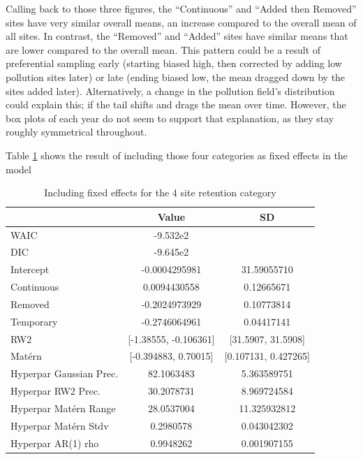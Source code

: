 Calling back to those three figures, the ``Continuous'' and ``Added then Removed'' sites have very similar overall means, an increase compared to the overall mean of all sites.  In contrast, the ``Removed'' and ``Added'' sites have similar means that are lower compared to the overall mean.
This pattern could be a result of preferential sampling early (starting biased high, then corrected by adding low pollution sites later) or late (ending biased low, the mean dragged down by the sites added later). Alternatively, a change in the pollution field's distribution could explain this; if the tail shifts and drags the mean over time.  However, the box plots of each year do not seem to support that explanation,
as they stay roughly symmetrical throughout.

Table \ref{tab:model_INLA_4site_Retention} shows the result of including those four categories as fixed effects in the model

\begin{table}[ht]
	\centering
	\begin{tabular}{l|c|c}
		& Value & SD  \\
		\hline
		WAIC & -9.532e2 & \\
		DIC & -9.645e2 & \\
		Intercept & -0.0004295981  & 31.59055710 \\
		Continuous & 0.0094430558  & 0.12665671   \\
		Removed & -0.2024973929   & 0.10773814   \\
		Temporary & -0.2746064961   & 0.04417141\\
		RW2 & [-1.38555, -0.106361] & [31.5907, 31.5908] \\
		Mat\'{e}rn & [-0.394883, 0.70015] & [0.107131, 0.427265] \\
		Hyperpar Gaussian Prec. & 82.1063483 & 5.363589751  \\
		Hyperpar RW2 Prec. & 30.2078731   &  8.969724584 \\
		Hyperpar Mat\'{e}rn Range & 28.0537004  & 11.325932812  \\
		Hyperpar Mat\'{e}rn Stdv & 0.2980578  & 0.043042302   \\
		Hyperpar AR(1) rho & 0.9948262   & 0.001907155  
	\end{tabular}
	\caption{Including fixed effects for the 4 site retention category }
	\label{tab:model_INLA_4site_Retention}
\end{table}



